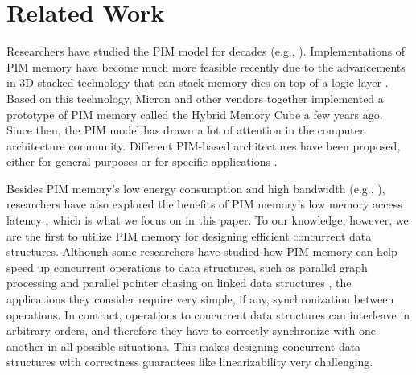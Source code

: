 \section{Related Work}

Researchers have studied the PIM model for decades (e.g., \cite{Stone1970, Kogge1994, 
Gokhale1995, Patterson1997, Oskin1998, KangHYKGLTP99, Hall1999}). 
Implementations of PIM memory have become much more feasible recently due to the advancements 
in 3D-stacked technology that can stack memory dies on top of a logic layer 
\cite{jeddeloh2012, Loh2008, Black2006}. 
Based on this technology, Micron and other vendors together implemented a prototype of 
PIM memory called the Hybrid Memory Cube \cite{website:HMC} a few years ago. 
Since then, the PIM model has drawn a lot of attention in the computer architecture community. 
Different PIM-based architectures have been proposed, either for general purposes or for 
specific applications \cite{Ahn2015:1, Ahn2015:2, Zhang2014:TTP, hsieh2016accelerating,
Azarkhish16, Akin2015:DRM, Azarkhish2015, AzarkhishPRLB17, boroumand2016, ZhuASSHPF13, ZhuGSPF13}.

Besides PIM memory's low energy consumption and high bandwidth 
(e.g., \cite{Ahn2015:2, Zhang2014:TTP, ZhuASSHPF13, AzarkhishPRLB17}), 
researchers have also explored the benefits of PIM memory's low memory access latency
\cite{Loh2008, hsieh2016accelerating, Azarkhish16}, which is what we focus on in this paper. 
To our knowledge, however, we are the first to utilize PIM memory for designing efficient 
concurrent data structures. 
Although some researchers have studied how PIM memory can help speed up concurrent 
operations to data structures, such as parallel graph processing \cite{Ahn2015:2} and  
parallel pointer chasing on linked data structures \cite{hsieh2016accelerating}, 
the applications they consider require very simple, if any, synchronization between operations. 
In contract, operations to concurrent data structures can interleave in arbitrary orders, 
and therefore they have to correctly synchronize with one another in all possible situations. 
This makes designing concurrent data structures with correctness guarantees like 
linearizability \cite{Herlihy90} very challenging. 

